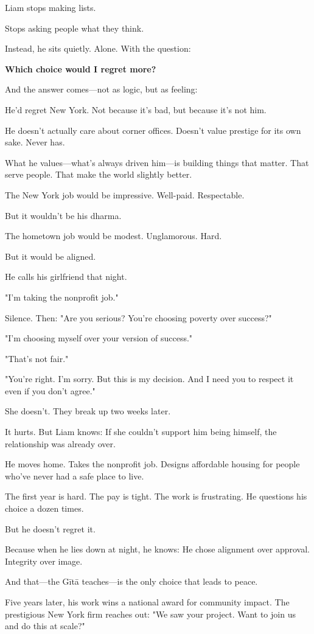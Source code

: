 \documentclass[11pt,twoside]{book}
\begin{document}
Liam stops making lists.

Stops asking people what they think.

Instead, he sits quietly. Alone. With the question:

\textbf{Which choice would I regret more?}

And the answer comes—not as logic, but as feeling:

He'd regret New York. Not because it's bad, but because it's not him.

He doesn't actually care about corner offices. Doesn't value prestige for its own sake. Never has.

What he values—what's always driven him—is building things that matter. That serve people. That make the world slightly better.

The New York job would be impressive. Well-paid. Respectable.

But it wouldn't be his dharma.

The hometown job would be modest. Unglamorous. Hard.

But it would be aligned.

He calls his girlfriend that night.

"I'm taking the nonprofit job."

Silence. Then: "Are you serious? You're choosing poverty over success?"

"I'm choosing myself over your version of success."

"That's not fair."

"You're right. I'm sorry. But this is my decision. And I need you to respect it even if you don't agree."

She doesn't. They break up two weeks later.

It hurts. But Liam knows: If she couldn't support him being himself, the relationship was already over.

He moves home. Takes the nonprofit job. Designs affordable housing for people who've never had a safe place to live.

The first year is hard. The pay is tight. The work is frustrating. He questions his choice a dozen times.

But he doesn't regret it.

Because when he lies down at night, he knows: He chose alignment over approval. Integrity over image.

And that—the Gītā teaches—is the only choice that leads to peace.

Five years later, his work wins a national award for community impact. The prestigious New York firm reaches out: "We saw your project. Want to join us and do this at scale?"
\end{document}
